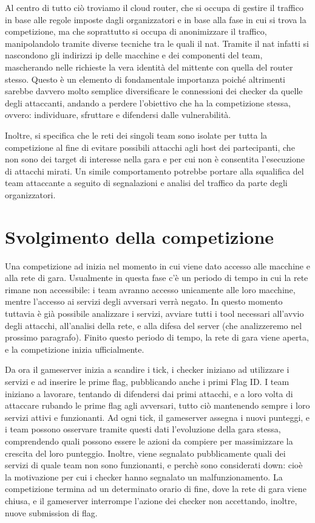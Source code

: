 Al centro di tutto ciò troviamo il cloud router, che si occupa di gestire il traffico in base alle regole imposte dagli organizzatori e in base alla fase in cui si trova la competizione, ma che soprattutto si occupa di anonimizzare il traffico, manipolandolo tramite diverse tecniche tra le quali il \gls{nat}. Tramite il \gls{nat} infatti si nascondono gli indirizzi \gls{ip} delle macchine e dei componenti del team, mascherando nelle richieste la vera identità del mittente con quella del router stesso. Questo è un elemento di fondamentale importanza poiché altrimenti sarebbe davvero molto semplice diversificare le connessioni dei checker da quelle degli attaccanti, andando a perdere l'obiettivo che ha la competizione stessa, ovvero: individuare, sfruttare e difendersi dalle vulnerabilità.

Inoltre, si specifica che le reti dei singoli team sono isolate per tutta la competizione al fine di evitare possibili attacchi agli host dei partecipanti, che non sono dei target di interesse nella gara e per cui non è consentita l'esecuzione di attacchi mirati.
Un simile comportamento potrebbe portare alla squalifica del team attaccante a seguito di segnalazioni e analisi del traffico da parte degli organizzatori.

\section{Svolgimento della competizione}

Una competizione \gls{ad} inizia nel momento in cui viene dato accesso alle macchine e alla rete di gara. Usualmente in questa fase c'è un periodo di tempo in cui la rete rimane non accessibile: i team avranno accesso unicamente alle loro macchine, mentre l'accesso ai servizi degli avversari verrà negato. In questo momento tuttavia è già possibile analizzare i servizi, avviare tutti i tool necessari all'avvio degli attacchi, all'analisi della rete, e alla difesa del server (che analizzeremo nel prossimo paragrafo). Finito questo periodo di tempo, la rete di gara viene aperta, e la competizione inizia ufficialmente.

Da ora il gameserver inizia a scandire i tick, i checker iniziano ad utilizzare i servizi e ad inserire le prime flag, pubblicando anche i primi Flag ID.
I team iniziano a lavorare, tentando di difendersi dai primi attacchi, e a loro volta di attaccare rubando le prime flag agli avversari, tutto ciò mantenendo sempre i loro servizi attivi e funzionanti. Ad ogni tick, il gameserver assegna i nuovi punteggi, e i team possono osservare tramite questi dati l'evoluzione della gara stessa, comprendendo quali possono essere le azioni da compiere per massimizzare la crescita del loro punteggio.
Inoltre, viene segnalato pubblicamente quali dei servizi di quale team non sono funzionanti, e perchè sono considerati down: cioè la motivazione per cui i checker hanno segnalato un malfunzionamento.
La competizione termina ad un determinato orario di fine, dove la rete di gara viene chiusa, e il gameserver interrompe l'azione dei checker non accettando, inoltre, nuove submission di flag.

